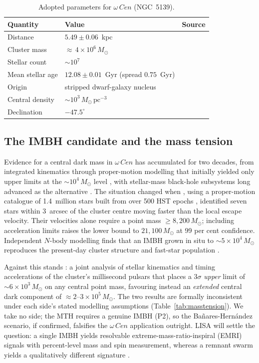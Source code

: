 \documentclass[11pt]{article}
\newcommand{\msun}{M_\odot}
\newcommand{\acen}{\ensuremath{\omega}\,Cen}
\begin{document}
\begin{table}[t]
\centering
\caption{Adopted parameters for $\acen$ (NGC~5139).}
\label{tab:params}
\small
\begin{tabular}{@{}lll@{}}
\toprule
Quantity & Value & Source \\
\midrule
Distance & $5.49 \pm 0.06$~kpc & \citet{haberle2025} \\
Cluster mass & ${\approx}\,4\times10^{6}\,\msun$ & \citet{baumgardt2018} \\
Stellar count & ${\sim}10^{7}$ & \citet{baumgardt2018} \\
Mean stellar age & $12.08 \pm 0.01$~Gyr (spread $0.75$~Gyr) & \citet{clontz2024} \\
Origin & stripped dwarf-galaxy nucleus & \citet{hilker2000,ibata2019} \\
Central density & ${\sim}10^{3}\,\msun\,\mathrm{pc}^{-3}$ & \citet{pryor1993} \\
Declination & $-47.5^{\circ}$ & \citet{harris1996} \\
\bottomrule
\end{tabular}
\end{table}

\subsection{The IMBH candidate and the mass tension}
Evidence for a central dark mass in $\acen$ has accumulated for two decades, from integrated kinematics \citep{noyola2008} through proper-motion modelling that initially yielded only upper limits at the ${\sim}10^{4}\,\msun$ level \citep{vandermarel2010}, with stellar-mass black-hole subsystems long advanced as the alternative \citep{zocchi2019,breen2013}. The situation changed when \citet{haberle2024a}, using a proper-motion catalogue of 1.4~million stars built from over 500 HST epochs \citep{haberle2024b}, identified seven stars within 3~arcsec of the cluster centre moving faster than the local escape velocity. Their velocities alone require a point mass $\ge 8{,}200\,\msun$; including acceleration limits raises the lower bound to $21{,}100\,\msun$ at 99 per cent confidence. Independent $N$-body modelling finds that an IMBH grown in situ to ${\sim}5\times10^{4}\,\msun$ reproduces the present-day cluster structure and fast-star population \citep{gonzalez2025}.

Against this stands \citet{banares2025}: a joint analysis of stellar kinematics and timing accelerations of the cluster's millisecond pulsars that places a $3\sigma$ \emph{upper} limit of ${\sim}6\times10^{3}\,\msun$ on any central point mass, favouring instead an \emph{extended} central dark component of ${\approx}2$--$3\times10^{5}\,\msun$. The two results are formally inconsistent under each side's stated modelling assumptions (Table~\ref{tab:masstension}). We take no side; the MTH requires a genuine IMBH (P2), so the Bañares-Hernández scenario, if confirmed, falsifies the $\acen$ application outright. LISA will settle the question: a single IMBH yields resolvable extreme-mass-ratio-inspiral (EMRI) signals with percent-level mass and spin measurement, whereas a remnant swarm yields a qualitatively different signature \citep{amaroseoane2018,babak2017,colpi2024}.
\end{document}
